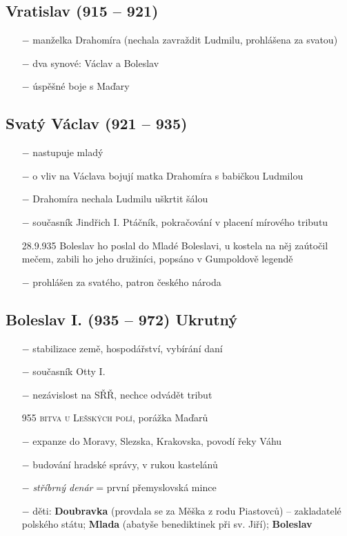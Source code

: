 \documentclass{article}
\begin{document}
\subsection*{Vratislav (915 -- 921)}
\begin{itemize}
    \vspace{-0.5em}
    \setlength\itemsep{0.15em}
    \item[$-$] manželka Drahomíra (nechala zavraždit Ludmilu, prohlášena za svatou)
    \item[$-$] dva synové: Václav a Boleslav
    \item[$-$] úspěšné boje s Maďary
\end{itemize}

\subsection*{Svatý Václav (921 -- 935)}
\begin{itemize}
    \vspace{-0.5em}
    \setlength\itemsep{0.15em}
    \item[$-$] nastupuje mladý
    \item[$-$] o vliv na Václava bojují matka Drahomíra s babičkou Ludmilou
    \item[$-$] Drahomíra nechala Ludmilu uškrtit šálou
    \item[$-$] současník Jindřich I. Ptáčník, pokračování v placení mírového tributu
    \item[28.9.935] Boleslav ho poslal do Mladé Boleslavi, u kostela na něj zaútočil mečem, zabili ho jeho družiníci, popsáno v Gumpoldově legendě
    \item[$-$] prohlášen za svatého, patron českého národa
\end{itemize}

\subsection*{Boleslav I. (935 -- 972) Ukrutný}
\begin{itemize}
    \vspace{-0.5em}
    \setlength\itemsep{0.15em}
    \item[$-$] stabilizace země, hospodářství, vybírání daní
    \item[$-$] současník Otty I.
    \item[$-$] nezávislost na SŘŘ, nechce odvádět tribut
    \item[955] \textsc{bitva u Lešských polí}, porážka Maďarů
    \item[$-$] expanze do Moravy, Slezska, Krakovska, povodí řeky Váhu
    \item[$-$] budování hradské správy, v rukou kastelánů
    \item[$-$] \textit{stříbrný denár} = první přemyslovská mince
    \item[$-$] děti: \textbf{Doubravka} (provdala se za Měška z rodu Piastovců) -- zakladatelé polského státu; \textbf{Mlada} (abatyše benediktinek při sv. Jiří); \textbf{Boleslav}
\end{itemize}
\end{document}
